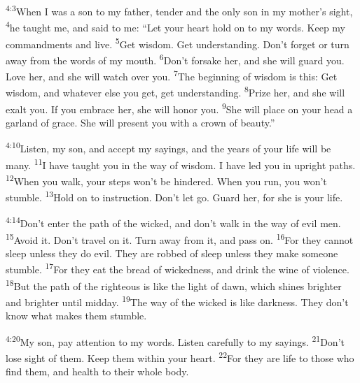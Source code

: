 \documentclass[openany,12pt,english]{book}
\newenvironment{para}{\par\pretolerance=100\tolerance=200\setlength{\emergencystretch}{0.6em}\relax}{\par}
\begin{document}
\begin{para}
    \textsuperscript{4:3}\thinspace{}When I was a son to my fa\-ther, ten\-der and the on\-ly son in my mother's sight,
    \textsuperscript{4}\thinspace{}he taught me, and said to me: “Let your heart hold on to my words. Keep my commandments and live.
    \textsuperscript{5}\thinspace{}Get wis\-dom. Get un\-der\-stand\-ing. Don't for\-get or turn a\-way from the words of my mouth.
    \textsuperscript{6}\thinspace{}Don't for\-sake her, and she will guard you. Love her, and she will watch o\-ver you.
    \textsuperscript{7}\thinspace{}The be\-gin\-ning of wis\-dom is this: Get wis\-dom, and what\-ev\-er else you get, get un\-der\-stand\-ing.
    \textsuperscript{8}\thinspace{}Prize her, and she will ex\-alt you. If you em\-brace her, she will hon\-or you.
    \textsuperscript{9}\thinspace{}She will place on your head a gar\-land of grace. She will pres\-ent you with a crown of beau\-ty.”
\end{para}

\begin{para}
    \textsuperscript{4:10}\thinspace{}Lis\-ten, my son, and ac\-cept my sayings, and the years of your life will be man\-y.
    \textsuperscript{11}\thinspace{}I have taught you in the way of wis\-dom. I have led you in up\-right paths.
    \textsuperscript{12}\thinspace{}When you walk, your steps won't be hindered. When you run, you won't stum\-ble.
    \textsuperscript{13}\thinspace{}Hold on to in\-struc\-tion. Don't let go. Guard her, for she is your life.
\end{para}

\begin{para}
    \textsuperscript{4:14}\thinspace{}Don't en\-ter the path of the wick\-ed, and don't walk in the way of evil men.
    \textsuperscript{15}\thinspace{}A\-void it. Don't trav\-el on it. Turn a\-way from it, and pass on.
    \textsuperscript{16}\thinspace{}For they can\-not sleep un\-less they do evil. They are robbed of sleep un\-less they make some\-one stum\-ble.
    \textsuperscript{17}\thinspace{}For they eat the bread of wick\-ed\-ness, and drink the wine of vi\-o\-lence.
    \textsuperscript{18}\thinspace{}But the path of the right\-eous is like the light of dawn, which shines brighter and brighter un\-til mid\-day.
    \textsuperscript{19}\thinspace{}The way of the wick\-ed is like dark\-ness. They don't know what makes them stum\-ble.
\end{para}

\begin{para}
    \textsuperscript{4:20}\thinspace{}My son, pay at\-ten\-tion to my words. Lis\-ten care\-ful\-ly to my sayings.
    \textsuperscript{21}\thinspace{}Don't lose sight of them. Keep them with\-in your heart.
    \textsuperscript{22}\thinspace{}For they are life to those who find them, and health to their whole bod\-y.
\end{para}
\end{document}
